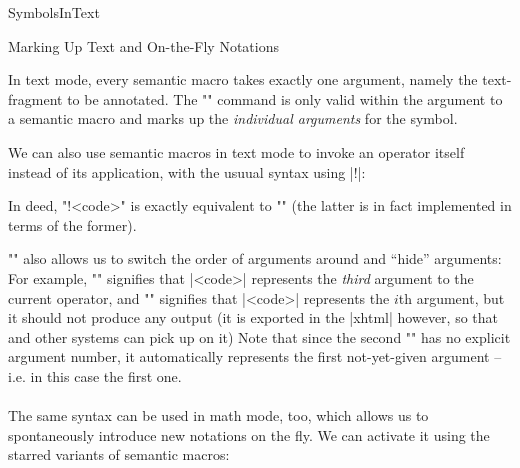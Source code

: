 \begin{smodule}{SymbolsInText}
\begin{sfragment}{Marking Up Text and On-the-Fly Notations}
    \begin{function}{\arg}
        In text mode, every semantic macro takes exactly one
        argument, namely the text-fragment to be annotated.
        The \stexcode"\arg" command is only valid within the
        argument to a semantic macro and marks up the 
        \emph{individual arguments} for the symbol.
    \end{function}

    We can also use semantic macros in text mode to invoke
    an operator itself instead of its application, with the
    usuual syntax using |!|:

    In deed, \stexcode"\symbolname!{<code>}" is exactly equivalent to
    \stexcode"" (the latter is in fact
    implemented in terms of the former).

    \stexcode"\arg" also allows us to switch the order of arguments
    around and ``hide'' arguments: For example, \stexcode""
    signifies that |<code>| represents the \emph{third}
    argument to the current operator, and \stexcode""
    signifies that |<code>| represents the $i$th argument, but it
    should not produce any output (it is exported in the |xhtml|
    however, so that \mmt and other systems can pick up on it)
    Note that since the second \stexcode"\arg" has no explicit argument
    number, it automatically represents the first not-yet-given
    argument -- i.e. in this case the first one.

    \paragraph{} The same syntax can be used in math mode, too,
    which allows us to spontaneously introduce new notations on the
    fly. We can activate it using the starred variants of semantic macros:


\end{sfragment}
\end{smodule}

